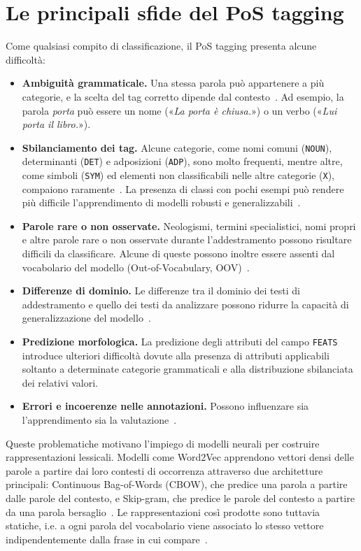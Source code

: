 \documentclass[12pt,a4paper]{report}
\begin{document}
\section{Le principali sfide del PoS tagging}
\label{sec:pos-tagging-challenges}
Come qualsiasi compito di classificazione, il PoS tagging presenta alcune difficoltà:
\begin{itemize}
    \item \textbf{Ambiguità grammaticale.} Una stessa parola può appartenere a più categorie, e la scelta del tag corretto dipende dal contesto~\cite{manning2011}. Ad esempio, la parola \emph{porta} può essere un nome («\emph{La porta è chiusa.}») o un verbo («\emph{Lui porta il libro.}»).
    \item \textbf{Sbilanciamento dei tag.} Alcune categorie, come nomi comuni (\texttt{NOUN}), determinanti (\texttt{DET}) e adposizioni (\texttt{ADP}), sono molto frequenti, mentre altre, come simboli (\texttt{SYM}) ed elementi non classificabili nelle altre categorie (\texttt{X}), compaiono raramente~\cite{isdt}. La presenza di classi con pochi esempi può rendere più difficile l'apprendimento di modelli robusti e generalizzabili~\cite{he2009}.
    \item \textbf{Parole rare o non osservate.} Neologismi, termini specialistici, nomi propri e altre parole rare o non osservate durante l'addestramento possono risultare difficili da classificare. Alcune di queste possono inoltre essere assenti dal vocabolario del modello (Out-of-Vocabulary, OOV)~\cite{plank2016}.
    \item \textbf{Differenze di dominio.} Le differenze tra il dominio dei testi di addestramento e quello dei testi da analizzare possono ridurre la capacità di generalizzazione del modello~\cite{manning2011}.
    \item \textbf{Predizione morfologica.} La predizione degli attributi del campo \texttt{FEATS} introduce ulteriori difficoltà dovute alla presenza di attributi applicabili soltanto a determinate categorie grammaticali e alla distribuzione sbilanciata dei relativi valori.
    \item \textbf{Errori e incoerenze nelle annotazioni.} Possono influenzare sia l'apprendimento sia la valutazione~\cite{manning2011}.
\end{itemize}

Queste problematiche motivano l'impiego di modelli neurali per costruire rappresentazioni lessicali. Modelli come Word2Vec apprendono vettori densi delle parole a partire dai loro contesti di occorrenza attraverso due architetture principali: Continuous Bag-of-Words (CBOW), che predice una parola a partire dalle parole del contesto, e Skip-gram, che predice le parole del contesto a partire da una parola bersaglio~\cite{mikolov2013efficient}. Le rappresentazioni così prodotte sono tuttavia statiche, i.e. a ogni parola del vocabolario viene associato lo stesso vettore indipendentemente dalla frase in cui compare~\cite{mikolov2013,goldberg2016}.
\end{document}
